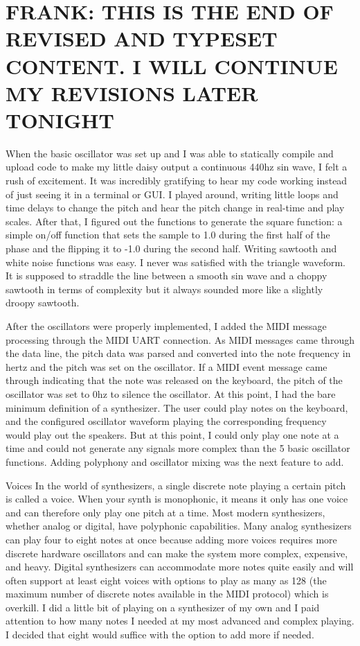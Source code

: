 \documentclass[acmlarge,screen]{acmart}
\begin{document}
\section{\textbf{FRANK: THIS IS THE END OF REVISED AND TYPESET CONTENT. I WILL CONTINUE MY REVISIONS LATER TONIGHT}}

When the basic oscillator was set up and I was able to statically compile and upload code to make my little daisy output a continuous 440hz sin wave, I felt a rush of excitement. It was incredibly gratifying to hear my code working instead of just seeing it in a terminal or GUI. I played around, writing little loops and time delays to change the pitch and hear the pitch change in real-time and play scales. After that, I figured out the functions to generate the square function: a simple on/off function that sets the sample to 1.0 during the first half of the phase and the flipping it to -1.0 during the second half. Writing sawtooth and white noise functions was easy. I never was satisfied with the triangle waveform. It is supposed to straddle the line between a smooth sin wave and a choppy sawtooth in terms of complexity but it always sounded more like a slightly droopy sawtooth.

After the oscillators were properly implemented, I added the MIDI message processing through the MIDI UART connection. As MIDI messages came through the data line, the pitch data was parsed and converted into the note frequency in hertz and the pitch was set on the oscillator. If a MIDI event message came through indicating that the note was released on the keyboard, the pitch of the oscillator was set to 0hz to silence the oscillator. At this point, I had the bare minimum definition of a synthesizer. The user could play notes on the keyboard, and the configured oscillator waveform playing the corresponding frequency would play out the speakers. But at this point, I could only play one note at a time and could not generate any signals more complex than the 5 basic oscillator functions. Adding polyphony and oscillator mixing was the next feature to add.

Voices
In the world of synthesizers, a single discrete note playing a certain pitch is called a voice. When your synth is monophonic, it means it only has one voice and can therefore only play one pitch at a time. Most modern synthesizers, whether analog or digital, have polyphonic capabilities. Many analog synthesizers can play four to eight notes at once because adding more voices requires more discrete hardware oscillators and can make the system more complex, expensive, and heavy. Digital synthesizers can accommodate more notes quite easily and will often support at least eight voices with options to play as many as 128 (the maximum number of discrete notes available in the MIDI protocol) which is overkill. I did a little bit of playing on a synthesizer of my own and I paid attention to how many notes I needed at my most advanced and complex playing. I decided that eight would suffice with the option to add more if needed.
\end{document}
